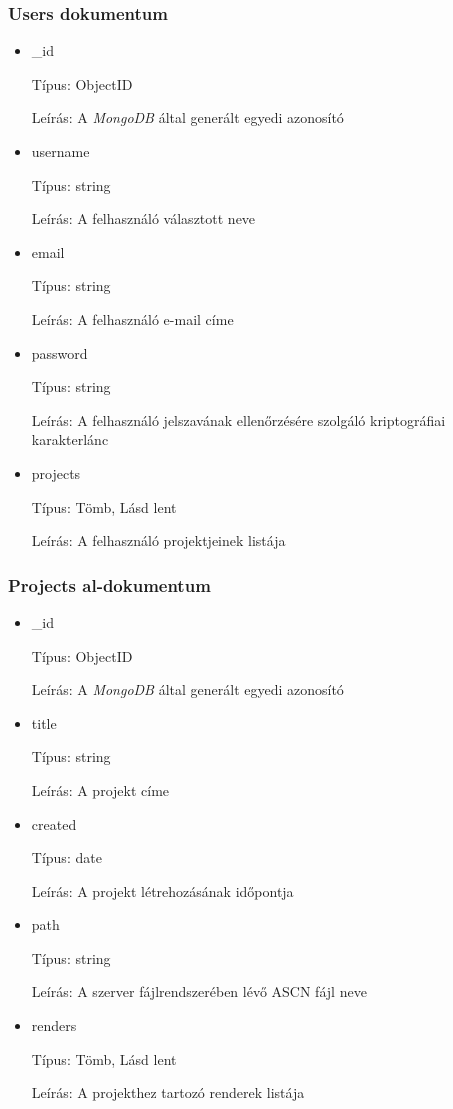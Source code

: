 \subsubsection{Users dokumentum}
\begin{itemize}
      \item \_id

            Típus: ObjectID

            Leírás: A \emph{MongoDB} által generált egyedi azonosító
      \item username

            Típus: string

            Leírás: A felhasználó választott neve
      \item email

            Típus: string

            Leírás: A felhasználó e-mail címe
      \item password

            Típus: string

            Leírás: A felhasználó jelszavának ellenőrzésére szolgáló kriptográfiai karakterlánc
      \item projects

            Típus: Tömb, Lásd lent

            Leírás: A felhasználó projektjeinek listája
\end{itemize}

\subsubsection{Projects al-dokumentum}

\begin{itemize}
      \item \_id

            Típus: ObjectID

            Leírás: A \emph{MongoDB} által generált egyedi azonosító
      \item title

            Típus: string

            Leírás: A projekt címe
      \item created

            Típus: date

            Leírás: A projekt létrehozásának időpontja
      \item path

            Típus: string

            Leírás: A szerver fájlrendszerében lévő ASCN fájl neve
      \item renders

            Típus: Tömb, Lásd lent

            Leírás: A projekthez tartozó renderek listája
\end{itemize}
